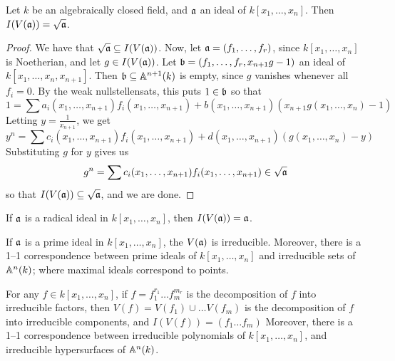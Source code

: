 \begin{theorem}\label{theorem_1.7.2}
    Let $k$ be an algebraically closed field, and  $\af$ an ideal of  $k[x_1,
    \dots, x_n]$. Then $I(V(\af))=\sqrt{\af}$.
\end{theorem}
\begin{proof}
    We have that $\sqrt{\af} \subseteq I(V(\af))$. Now, let $\af=(f_1, \dots,
    f_r)$, since $k[x_1, \dots, x_n]$ is Noetherian, and let $g \in I(V(\af))$.
    Let $\bf=(f_1, \dots, f_r,x_{n+1}g-1)$ an ideal of $k[x_1, \dots,
    x_n,x_{n+1}]$. Then $\bf \subseteq \A^{n+1}(k)$ is empty, since $g$ vanishes
    whenever all $f_i=0$. By the weak nullstellensats, this puts  $1 \in \bf$ so
    that
    \begin{equation*}
        1=\sum{a_i(x_1, \dots, x_{n+1})f_i(x_1, \dots, x_{n+1})}+b(x_1, \dots,
        x_{n+1})(x_{n+1}g(x_1, \dots, x_n)-1)
    \end{equation*}
    Letting $y=\frac{1}{x_{n+1}}$, we get
    \begin{equation*}
        y^n=\sum{c_i(x_1, \dots, x_{n+1})f_i(x_1, \dots, x_{n+1})}+d(x_1, \dots,
        x_{n+1})(g(x_1, \dots, x_n)-y)
    \end{equation*}
    Substituting $g$ for $y$ gives us
    \begin{equation*}
        g^n=\sum{c_i(x_1, \dots, x_{n+1})f_i(x_1, \dots, x_{n+1})} \in \sqrt{\af}
    \end{equation*}
    so that $I(V(\af)) \subseteq \sqrt{\af}$, and we are done.
\end{proof}
\begin{corollary}
    If $\af$ is a radical ideal in  $k[x_1, \dots, x_n]$, then $I(V(\af))=\af$.
\end{corollary}
\begin{corollary}
    If $\af$ is a prime ideal in $k[x_1, \dots, x_n]$, the $V(\af)$ is
    irreducible. Moreover, there is a 1--1 correspondence between prime ideals
    of $k[x_1, \dots, x_n]$ and irreducible sets of $\A^n(k)$; where maximal
    ideals correspond to points.
\end{corollary}
\begin{corollary}
    For any $f \in k[x_1, \dots, x_n]$, if $f=f_1^{r_1} \dots f_m^{m_r}$ is the
    decomposition of $f$ into irreducible factors, then  $V(f)=V(f_1) \cup \dots
    V(f_m)$ is the decomposition of $f$ into irreducible components, and
    $I(V(f))=(f_1 \dots f_m)$ Moreover, there is a 1--1 correspondence between irreducible
    polynomials of  $k[x_1, \dots, x_n]$, and irreducible hypersurfaces of
    $\A^n(k)$.
\end{corollary}

